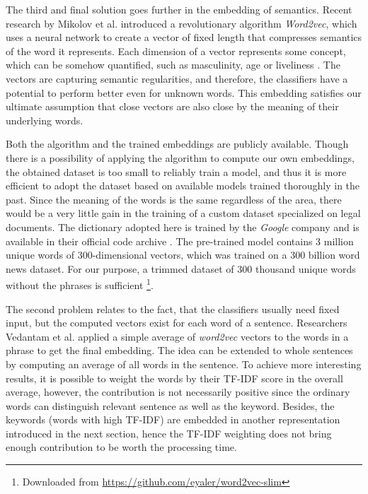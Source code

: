 \documentclass[
  digital, %
  notable,   %
  nolof,     %
  nolot,     %
]{fithesis3}
\begin{document}
The third and final solution goes further in the embedding of semantics.
Recent research by Mikolov et al. \cite{mikolov2013efficient} introduced a revolutionary algorithm \textit{Word2vec}, which uses a neural network to create a vector of fixed length that compresses semantics of the word it represents.
Each dimension of a vector represents some concept, which can be somehow quantified, such as masculinity, age or liveliness \cite{mikolov2013linguistic}.
The vectors are capturing semantic regularities, and therefore, the classifiers have a potential to perform better even for unknown words.
This embedding satisfies our ultimate assumption that close vectors are also close by the meaning of their underlying words.

Both the algorithm and the trained embeddings are publicly available.
Though there is a possibility of applying the algorithm to compute our own embeddings, the obtained dataset is too small to reliably train a model, and thus it is more efficient to adopt the dataset based on available models trained thoroughly in the past.
Since the meaning of the words is the same regardless of the area, there would be a very little gain in the training of a custom dataset specialized on legal documents.
The dictionary adopted here is trained by the \textit{Google} company and is available in their official code archive \cite{word2vecGoogle}.
The pre-trained model contains 3 million unique words of 300-dimensional vectors, which was trained on a 300 billion word news dataset.
For our purpose, a trimmed dataset of 300 thousand unique words without the phrases is sufficient \footnote{Downloaded from \url{https://github.com/eyaler/word2vec-slim}}.

The second problem relates to the fact, that the classifiers usually need fixed input, but the computed vectors exist for each word of a sentence.
Researchers Vedantam et al. \cite{vedantam2015learning} applied a simple average of \textit{word2vec} vectors to the words in a phrase to get the final embedding.
The idea can be extended to whole sentences by computing an average of all words in the sentence.
To achieve more interesting results, it is possible to weight the words by their TF-IDF score in the overall average, however, the contribution is not necessarily positive since the ordinary words can distinguish relevant sentence as well as the keyword.
Besides, the keywords (words with high TF-IDF) are embedded in another representation introduced in the next section, hence the TF-IDF weighting does not bring enough contribution to be worth the processing time.
\end{document}
